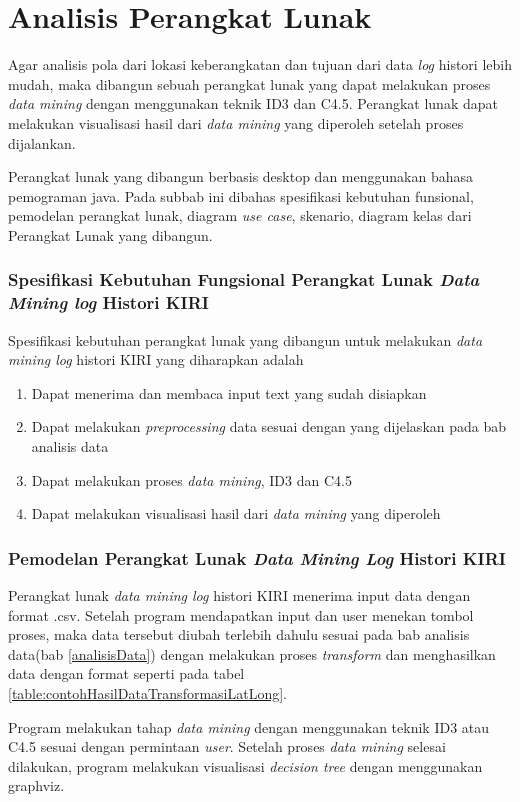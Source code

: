 \section{Analisis Perangkat Lunak}
Agar analisis pola dari lokasi keberangkatan dan tujuan dari data \textsl{log} histori lebih mudah, maka dibangun sebuah perangkat lunak yang dapat melakukan proses \textsl{data mining} dengan menggunakan teknik ID3 dan C4.5. Perangkat lunak dapat melakukan visualisasi hasil dari \textsl{data mining} yang diperoleh setelah proses dijalankan.

Perangkat lunak yang dibangun berbasis desktop dan menggunakan bahasa pemograman java. Pada subbab ini dibahas spesifikasi kebutuhan funsional, pemodelan perangkat lunak, diagram \textsl{use case}, skenario, diagram kelas dari Perangkat Lunak yang dibangun.

\subsubsection{Spesifikasi Kebutuhan Fungsional Perangkat Lunak \textsl{Data Mining log} Histori KIRI}
Spesifikasi kebutuhan perangkat lunak yang dibangun untuk melakukan \textsl{data mining log} histori KIRI yang diharapkan adalah
\begin{enumerate}
	\item Dapat menerima dan membaca input text yang sudah disiapkan
	\item Dapat melakukan \textsl{preprocessing} data sesuai dengan yang dijelaskan pada bab analisis data
	\item Dapat melakukan proses \textsl{data mining}, ID3 dan C4.5
	\item Dapat melakukan visualisasi hasil dari \textsl{data mining} yang diperoleh
\end{enumerate}

\subsubsection{Pemodelan Perangkat Lunak \textsl{Data Mining Log} Histori KIRI}
Perangkat lunak \textsl{data mining log} histori KIRI menerima input data dengan format .csv. Setelah program mendapatkan input dan user menekan tombol proses, maka data tersebut diubah terlebih dahulu sesuai pada bab analisis data(bab \ref{analisisData}) dengan melakukan proses \textsl{transform} dan menghasilkan data dengan format seperti pada tabel \ref{table:contohHasilDataTransformasiLatLong}.

Program melakukan tahap \textsl{data mining} dengan menggunakan teknik ID3 atau C4.5 sesuai dengan permintaan \textsl{user}. Setelah proses \textsl{data mining} selesai dilakukan, program melakukan visualisasi \textsl{decision tree} dengan menggunakan graphviz.  

